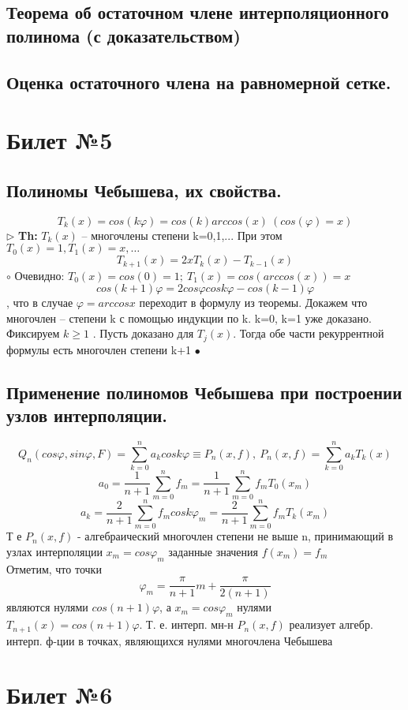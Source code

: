 \documentclass[a4paper]{article}
\begin{document}
\subsection{Теорема об остаточном члене интерполяционного полинома (с доказательством)}
\subsection{Оценка остаточного члена на равномерной сетке.}

\section{Билет №5}
\subsection{Полиномы Чебышева, их свойства.}
$$ T_k(x) = cos(k\varphi) = cos(k)arccos(x) \ (cos(\varphi)=x)$$
$\triangleright$ \textbf{Th:} $T_k(x)$ – многочлены степени k=0,1,... При этом $T_0(x) = 1, T_1(x) = x, \ldots$
$$ T_{k+1}(x) = 2x T_k(x) - T_{k-1}(x) $$
	$\circ$ 
	Очевидно: $T_0(x) = cos(0) = 1; \ T_1(x) = cos(arccos(x)) = x$
	$$cos (k+1)\varphi = 2 cos\varphi cos k\varphi - cos(k-1)\varphi$$, что в случае $\varphi=arccosx$ переходит в формулу из теоремы.
	Докажем что многочлен – степени k с помощью индукции по k. k=0, k=1 уже доказано. Фиксируем $k \ge 1$ . Пусть доказано для $T_j(x)$. Тогда обе части рекуррентной формулы есть многочлен степени k+1
	$\bullet$
\subsection{Применение полиномов Чебышева при построении узлов интерполяции.}
$$ Q_n(cos \varphi, sin\varphi, F) = \sum_{k=0}^n a_kcos k\varphi \equiv P_n(x,f), \ P_n(x,f) = \sum_{k=0}^n a_k T_k(x)$$
$$ a_0 = \frac{1}{n+1} \sum_{m=0}^n f_m = \frac{1}{n+1} \sum_{m=0}^n f_mT_0(x_m)$$
$$ a_k = \frac{2}{n+1} \sum_{m=0}^n f_m cos k\varphi_m = \frac{2}{n+1} \sum_{m=0}^n f_mT_k(x_m) $$
Т е $P_n(x,f)$ - алгебраический многочлен степени не выше n, принимающий в узлах интерполяции $x_m = cos\varphi_m$ заданные значения $f(x_m) = f_m$ \\
Отметим, что точки $$\varphi_m = \frac{\pi}{n+1}m + \frac{\pi}{2(n+1)} $$ являются нулями $cos(n+1)\varphi$, а $x_m=cos\varphi_m$ нулями $T_{n+1}(x) = cos(n+1)\varphi$. Т. е. интерп. мн-н $P_n(x,f)$ реализует алгебр. интерп. ф-ции в точках, являющихся нулями многочлена Чебышева


\section{Билет №6}
\end{document}
